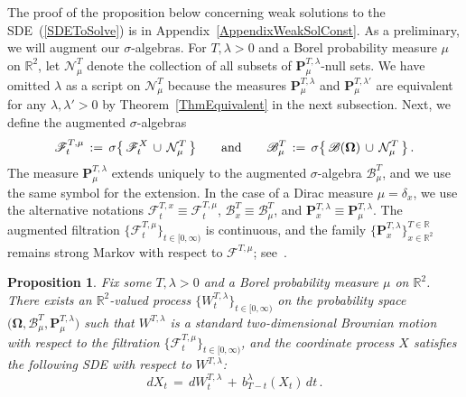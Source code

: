 \documentclass[10pt]{article}
\numberwithin{equation}{section}
\newtheorem{proposition}[theorem]{Proposition}
\theoremstyle{definition}
\newcommand{\R}{{\mathbb R}}
\begin{document}
 The proof of the proposition below  concerning weak solutions to the SDE~(\ref{SDEToSolve}) is in Appendix~\ref{AppendixWeakSolConst}.   As a preliminary, we will augment our $\sigma$-algebras.  For $T,\lambda>0 $ and a Borel probability measure $\mu$ on $\R^2$, let  $\mathcal{N}^{T}_{ \mu}$ denote the collection of all subsets of  $\mathbf{P}^{T,\lambda}_{\mu}$-null sets.  We  have omitted $\lambda$ as a script on $\mathcal{N}^{T}_{\mu}$ because the measures $\mathbf{P}^{T,\lambda}_{\mu}$ and $\mathbf{P}^{T,\lambda'}_{\mu}$ are equivalent for any $\lambda,\lambda'>0$ by Theorem~\ref{ThmEquivalent} in the next subsection.  Next, we define the augmented  $\sigma$-algebras 
 \begin{align}\label{Augmented}
 \mathscr{F}_t^{T,\mu}\,:=\,\sigma\big\{\,\mathscr{F}_t^X \,\cup \,\mathcal{N}^{T}_{\mu} \, \big\} \hspace{.7cm}\text{and}\hspace{.7cm}  \mathscr{B}^{T}_{\mu}\,:=\, \sigma\big\{ \,\mathscr{B}(\boldsymbol{\Omega}) \,\cup\, \mathcal{N}^{T}_{\mu} \, \big\} \,.
 \end{align}
  The measure $\mathbf{P}^{T,\lambda}_{\mu}$ extends uniquely to the augmented $\sigma$-algebra $\mathscr{B}^{T}_{\mu}$, and we use the same symbol for the extension.   In the case of a Dirac measure $\mu=\delta_x$, we use the alternative notations $\mathscr{F}_t^{T,x}\equiv \mathscr{F}_t^{T,\mu}  $, $\mathscr{B}^{T}_{x}\equiv \mathscr{B}^{T}_{\mu}$, and $\mathbf{P}^{T,\lambda}_{x}\equiv \mathbf{P}^{T,\lambda}_{\mu} $. The augmented filtration $\{\mathscr{F}_t^{T,\mu}\}_{t\in [0,\infty)}$ is continuous, and the family $\{ \mathbf{P}^{T,\lambda}_{x} \}_{x\in \R^2}^{T\in \R} $ remains strong Markov with respect to $\mathscr{F}^{T,\mu}$; see~\cite[Sec.\ 2.7(A-B)]{Karatzas}. 
\begin{proposition}\label{PropStochPre} Fix some $T,\lambda>0$ and a Borel probability measure $\mu$ on $\R^2$. There exists an  $\R^2$-valued process  $\{  W^{T,\lambda }_t\}_{t\in [0,\infty)}$ on the probability space $\big(\boldsymbol{\Omega}, \mathscr{B}^{T}_{\mu},\mathbf{P}^{T,\lambda}_{\mu}\big)$  
 such that  $W^{T,\lambda }$ is a standard two-dimensional Brownian motion with respect to the filtration  $\{\mathscr{F}_t^{T,\mu}   \}_{t\in [0,\infty)}$, and the coordinate process  $X$   satisfies the following  SDE  with respect to $W^{T,\lambda }$:
$$ dX_t\,=\,dW_{t}^{T,\lambda}\,+ \,b_{T-t}^{\lambda}(X_t) \, dt \,.  $$
\end{proposition}\vspace{.2cm}
\end{document}
